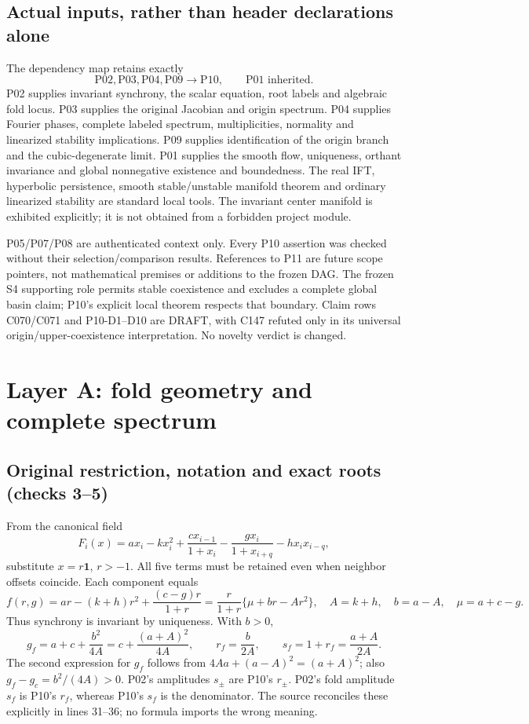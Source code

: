 \documentclass[11pt]{article}
\newcommand{\one}{\mathbf1}
\begin{document}
\subsection{Actual inputs, rather than header declarations alone}
The dependency map retains exactly
\[
 \mathrm{P02},\mathrm{P03},\mathrm{P04},\mathrm{P09}\longrightarrow\mathrm{P10},
 \qquad\mathrm{P01}\text{ inherited}.
\]
P02 supplies invariant synchrony, the scalar equation, root labels and
algebraic fold locus. P03 supplies the original Jacobian and origin spectrum.
P04 supplies Fourier phases, complete labeled spectrum, multiplicities,
normality and linearized stability implications. P09 supplies identification
of the origin branch and the cubic-degenerate limit. P01 supplies the smooth
flow, uniqueness, orthant invariance and global nonnegative existence and
boundedness. The real IFT, hyperbolic persistence, smooth stable/unstable
manifold theorem and ordinary linearized stability are standard local tools.
The invariant center manifold is exhibited explicitly; it is not obtained
from a forbidden project module.

P05/P07/P08 are authenticated context only. Every P10 assertion was checked
without their selection/comparison results. References to P11 are future
scope pointers, not mathematical premises or additions to the frozen DAG.
The frozen S4 supporting role permits stable coexistence and excludes a
complete global basin claim; P10's explicit local theorem respects that
boundary. Claim rows C070/C071 and P10-D1--D10 are DRAFT, with C147 refuted
only in its universal origin/upper-coexistence interpretation. No novelty
verdict is changed.

\section{Layer A: fold geometry and complete spectrum}
\label{sec:A}
\subsection{Original restriction, notation and exact roots (checks 3--5)}
From the canonical field
\begin{equation}
 F_i(x)=a x_i-kx_i^2+\frac{c x_{i-1}}{1+x_i}
       -\frac{g x_i}{1+x_{i+q}}-h x_i x_{i-q},
 \label{eq:original}
\end{equation}
substitute $x=r\one$, $r>-1$. All five terms must be retained even when
neighbor offsets coincide. Each component equals
\[
 f(r,g)=ar-(k+h)r^2+\frac{(c-g)r}{1+r}
       =\frac r{1+r}\{\mu+br-Ar^2\},
 \quad A=k+h,\quad b=a-A,\quad\mu=a+c-g.
\]
Thus synchrony is invariant by uniqueness. With $b>0$,
\[
 g_f=a+c+\frac{b^2}{4A}
     =c+\frac{(a+A)^2}{4A},\qquad
 r_f=\frac b{2A},\qquad s_f=1+r_f=\frac{a+A}{2A}.
\]
The second expression for $g_f$ follows from
$4Aa+(a-A)^2=(a+A)^2$; also $g_f-g_c=b^2/(4A)>0$.
P02's amplitudes $s_\pm$ are P10's $r_\pm$. P02's fold amplitude
$s_f$ is P10's $r_f$, whereas P10's $s_f$ is the denominator.
The source reconciles these explicitly in lines 31--36; no formula imports
the wrong meaning.
\end{document}
